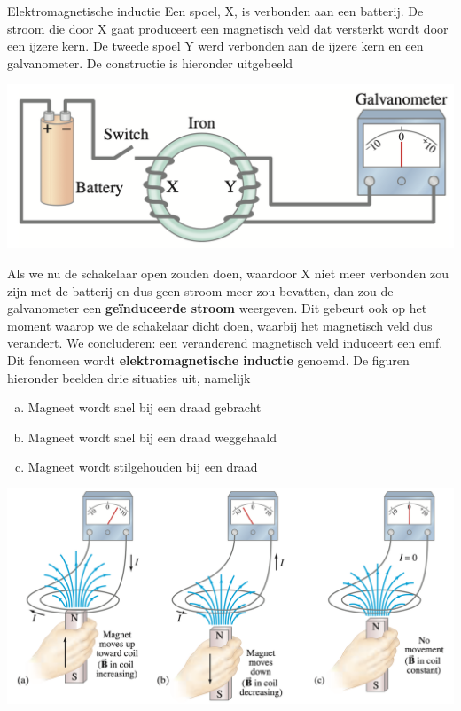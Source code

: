\begin{theo}{Elektromagnetische inductie}
    Een spoel, X, is verbonden aan een batterij. De stroom die door X gaat produceert een magnetisch veld dat versterkt
    wordt door een ijzere kern. De tweede spoel Y werd verbonden aan de ijzere kern en een galvanometer. De constructie is hieronder uitgebeeld
    
    \begin{center}
        \includegraphics[scale = 0.35]{Images/Magnetisme/MagnetischeInductieExperiment.png}
    \end{center}

    \noindent Als we nu de schakelaar open zouden doen, waardoor X niet meer verbonden zou zijn met de batterij en dus geen stroom meer zou bevatten, 
    dan zou de galvanometer een \textbf{geïnduceerde stroom} weergeven. Dit gebeurt ook op het moment waarop we de schakelaar dicht doen, waarbij het
    magnetisch veld dus verandert. We concluderen: een veranderend magnetisch veld induceert een emf. Dit fenomeen wordt \textbf{elektromagnetische inductie} genoemd. 
    De figuren hieronder beelden drie situaties uit, namelijk
    \begin{enumerate}[(a)]
        \item Magneet wordt snel bij een draad gebracht
        \item Magneet wordt snel bij een draad weggehaald
        \item Magneet wordt stilgehouden bij een draad
    \end{enumerate}

    \begin{center}
        \includegraphics[scale = 0.35]{Images/Magnetisme/MagnetischeInductieMagneet.png}
    \end{center}
    \vspace{-0.25cm}
\end{theo}

